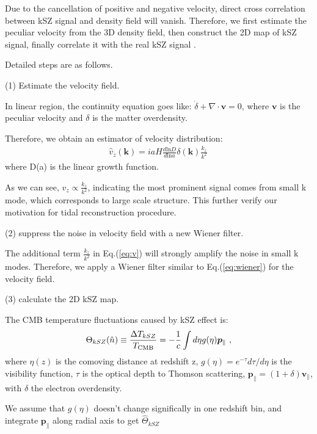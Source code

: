 Due to the cancellation of positive and negative velocity, direct cross correlation between kSZ signal and density field will vanish.
Therefore, we first estimate the peculiar velocity from the 3D density field, 
then construct the 2D map of kSZ signal, 
finally correlate it with the real kSZ signal \cite{Shao11}.

Detailed steps are as follows.

(1) Estimate the velocity field.

In linear region, the continuity equation goes like:
$\dot \delta+\nabla \cdot \bm{v}=0$, 
where $\bm{v}$ is the peculiar velocity and $\delta$ is the matter overdensity. 

Therefore, we obtain an estimator of velocity distribution:
\begin{eqnarray}
	\label{eq:v}
\hat v_z(\bm{k})=i a H \frac{d\mathrm{ln}D}{d\mathrm{ln}a}\delta(\bm{k})\frac{k_z}{k^2}\,
\end{eqnarray}
where D(a) is the linear growth function.

As we can see, $v_z \propto \frac{k_z}{k^2}$, indicating the most prominent signal comes from small k mode, which corresponds to large scale structure. 
This further verify our motivation for tidal reconstruction procedure.

(2) suppress the noise in velocity field with a new Wiener filter.

The additional term $\frac{k_z}{k^2}$ in Eq.(\ref{eq:v})
will strongly amplify the noise in small k modes. 
Therefore, we apply a Wiener filter similar to Eq.(\ref{eq:wiener}) for the velocity field.

(3) calculate the 2D kSZ map.

The CMB temperature fluctuations caused by kSZ effect is:
\begin{eqnarray}
\label{eq:ksz}
\Theta_{kSZ}(\hat n)\equiv\frac{\Delta T_{kSZ}}{T_{\mathrm{CMB}}}
=-\frac{1}{c}\int d\eta  g(\eta)  \bm{p}_\parallel\ ,
\end{eqnarray}
where $\eta(z)$ is the comoving distance at redshift z, $g(\eta)=e^{-\tau} d\tau/d\eta$ is the visibility function, $\tau$ is the optical depth to Thomson scattering, $\bm{p}_\parallel=(1+\delta)\bm{v}_\parallel$, with $\delta$ the electron overdensity. 

We assume that $g(\eta)$ doesn't change significally in one redshift bin, 
and integrate $\bm{p}_\parallel$ along radial axis to get $\hat \Theta_{kSZ}$


